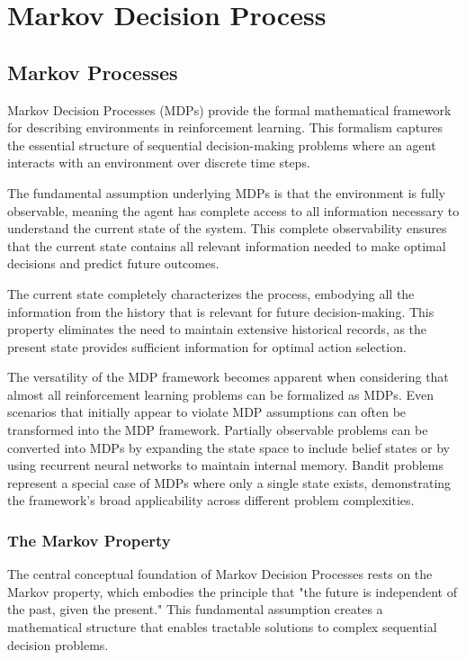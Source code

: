\chapter{Markov Decision Process}

\section{Markov Processes}


Markov Decision Processes (MDPs) provide the formal mathematical framework for describing environments in reinforcement learning. This formalism captures the essential structure of sequential decision-making problems where an agent interacts with an environment over discrete time steps.

The fundamental assumption underlying MDPs is that the environment is fully observable, meaning the agent has complete access to all information necessary to understand the current state of the system. This complete observability ensures that the current state contains all relevant information needed to make optimal decisions and predict future outcomes.

The current state completely characterizes the process, embodying all the information from the history that is relevant for future decision-making. This property eliminates the need to maintain extensive historical records, as the present state provides sufficient information for optimal action selection.

The versatility of the MDP framework becomes apparent when considering that almost all reinforcement learning problems can be formalized as MDPs. Even scenarios that initially appear to violate MDP assumptions can often be transformed into the MDP framework. Partially observable problems can be converted into MDPs by expanding the state space to include belief states or by using recurrent neural networks to maintain internal memory. Bandit problems represent a special case of MDPs where only a single state exists, demonstrating the framework's broad applicability across different problem complexities.


\subsection{The Markov Property}


The central conceptual foundation of Markov Decision Processes rests on the Markov property, which embodies the principle that "the future is independent of the past, given the present." This fundamental assumption creates a mathematical structure that enables tractable solutions to complex sequential decision problems.

